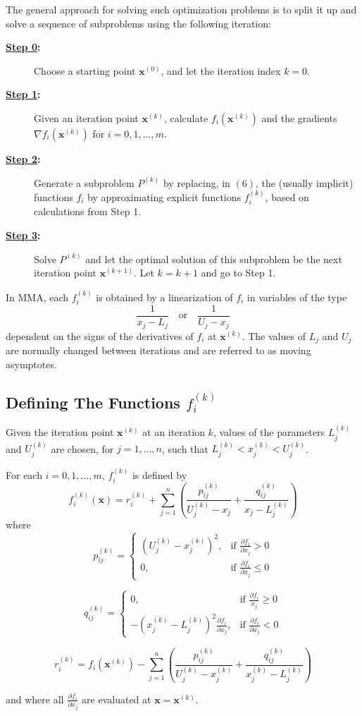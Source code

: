 \documentclass[11pt]{article}
\begin{document}
The general approach for solving such optimization problems is to split it up and solve a sequence of subproblems using the following iteration:
{\color{baystate}
\begin{description}
	\item[\textbf{\underline{Step 0}:}] Choose a starting point $\mathbf{x}^{(0)}$, and let the iteration index $k=0$.
	\item[\textbf{\underline{Step 1}:}] Given an iteration point $\mathbf{x}^{(k)}$, calculate $f_i(\mathbf{x}^{(k)})$ and the gradients $\nabla f_i(\mathbf{x}^{(k)})$ for $i=0,1,\ldots,m$.
	\item[\textbf{\underline{Step 2}:}] Generate a subproblem $P^{(k)}$ by replacing, in $(6)$, the (usually implicit) functions $f_i$ by approximating explicit functions $f_i^{(k)}$, based on calculations from Step 1.
	\item[\textbf{\underline{Step 3}:}] Solve $P^{(k)}$ and let the optimal solution of this subproblem be the next iteration point $\mathbf{x}^{(k+1)}$. Let $k=k+1$ and go to Step 1.
\end{description}
}

In MMA, each $f_i^{(k)}$ is obtained by a linearization of $f_i$ in variables of the type $$\frac{1}{x_j-L_j}\quad\text{or}\quad\frac{1}{U_j-x_j}$$ dependent on the signs of the derivatives of $f_i$ at $\mathbf{x}^{(k)}$. The values of $L_j$ and $U_j$ are normally changed between iterations and are referred to as {\color{tiananmen}moving asymptotes}.

\subsection*{Defining The Functions $f_i^{(k)}$}

Given the iteration point $\mathbf{x}^{(k)}$ at an iteration $k$, values of the parameters $L_j^{(k)}$ and $U_j^{(k)}$ are chosen, for $j=1,\ldots,n$, such that $L_j^{(k)}<x_j^{(k)}<U_j^{(k)}$.

{\color{baystate}
For each $i=0,1,\ldots,m$, $f_i^{(k)}$ is defined by $$f_i^{(k)}(\mathbf{x})=r_i^{(k)}+\sum\limits_{j=1}^{n}\left(\frac{p_{ij}^{(k)}}{U_j^{(k)}-x_j}+\frac{q_{ij}^{(k)}}{x_j-L_j^{(k)}}\right)$$
where
$$p_{ij}^{(k)}=\begin{cases}
	\left(U_j^{(k)}-x_j^{(k)}\right)^2, & \text{if }\frac{\partial f_i}{\partial x_j}>0\\
	0, & \text{if }\frac{\partial f_i}{\partial x_j}\leq 0
\end{cases}$$

$$q_{ij}^{(k)}=\begin{cases}
	0, & \text{if }\frac{\partial f_i}{x_j}\geq 0\\
	-\left(x_j^{(k)}-L_j^{(k)}\right)^2\frac{\partial f_i}{\partial x_j}, & \text{if }\frac{\partial f_i}{\partial x_j}<0
\end{cases}$$

$$r_i^{(k)}=f_i(\mathbf{x}^{(k)})-\sum\limits_{j=1}^{n}\left(\frac{p_{ij}^{(k)}}{U_j^{(k)}-x_j^{(k)}}+\frac{q_{ij}^{(k)}}{x_j^{(k)}-L_j^{(k)}}\right)$$

and where all $\frac{\partial f_i}{\partial x_j}$ are evaluated at $\mathbf{x}=\mathbf{x}^{(k)}$.
}
\end{document}
